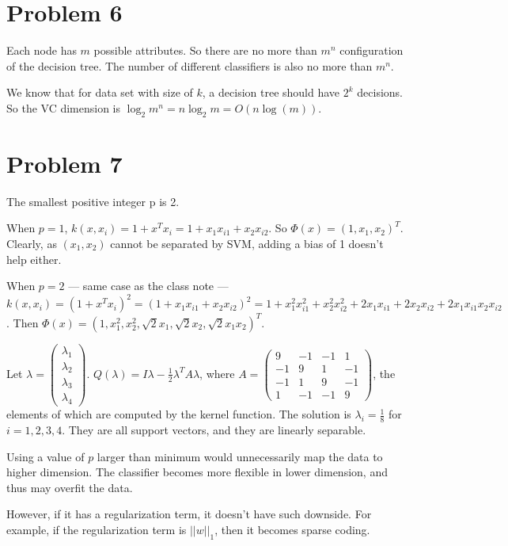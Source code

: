 \documentclass[10pt]{article}
\begin{document}
\section*{Problem 6}

Each node has $m$ possible attributes. So there are no more than
$m^n$ configuration of the decision tree. The number of different
classifiers is also no more than $m^n$.

We know that for data set with size of $k$, a decision tree should
have $2^k$ decisions. So the VC dimension is $\log_2{m^n} = n
\log_2{m} = O(n\log(m))$.

\section*{Problem 7}

The smallest positive integer p is 2.

When $p = 1$, $k(x, x_i) = 1 + x^T x_i = 1 + x_1 x_{i1} + x_2 x_{i2}$.
So $\Phi(x) = (1, x_1, x_2)^T$. Clearly, as $(x_1, x_2)$ cannot be
separated by SVM, adding a bias of 1 doesn't help either.

When $p = 2$ --- same case as the class note --- $k(x, x_i) = (1 + x^T
x_i)^2 = (1 + x_1 x_{i1} + x_2 x_{i2})^2 = 1 + x_1^2 x_{i1}^2 + x_2^2
x_{i2}^2 + 2x_1x_{i1} + 2x_2x_{i2} + 2x_1x_{i1}x_2x_{i2}$. Then
$\Phi(x) = (1, x_1^2, x_2^2, \sqrt{2}x_1, \sqrt{2}x_2,
\sqrt{2}x_1x_2)^T$.

% 
% 
% 

Let $\lambda = \begin{pmatrix}
\lambda_1\\\lambda_2\\\lambda_3\\\lambda_4 \end{pmatrix}$.
$Q(\lambda) = I\lambda - \frac{1}{2} \lambda^T A \lambda $, where $A =
\begin{pmatrix}
9 & -1 & -1 & 1\\
-1 & 9 & 1 & -1\\
-1 & 1 & 9 & -1\\
1 & -1 & -1 & 9
\end{pmatrix}
$, the elements of which are computed by the kernel function. The
solution is $\lambda_i = \frac{1}{8}$ for $i = 1,2,3,4$. They are all
support vectors, and they are linearly separable.

\hfill

Using a value of $p$ larger than minimum would unnecessarily map the
data to higher dimension. The classifier becomes more flexible in
lower dimension, and thus may overfit the data.

However, if it has a regularization term, it doesn't have such
downside. For example, if the regularization term is $||w||_1$, then
it becomes sparse coding.
\end{document}
